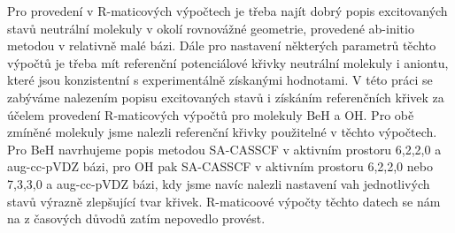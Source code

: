 Pro provedení v R-maticových výpočtech je třeba najít dobrý popis excitovaných stavů 
neutrální molekuly v okolí rovnovážné geometrie, 
provedené ab-initio metodou v relativně malé bázi. Dále  pro nastavení některých 
parametrů těchto výpočtů je třeba mít referenční 
potenciálové křivky neutrální molekuly i aniontu, které jsou konzistentní s 
experimentálně získanými hodnotami. V této práci se 
zabýváme nalezením popisu excitovaných stavů i získáním referenčních křivek za účelem 
provedení R-maticových výpočtů pro molekuly 
BeH a OH. 
Pro obě zmíněné molekuly jsme nalezli referenční křivky použitelné v těchto výpočtech. 
Pro BeH navrhujeme popis metodou SA-CASSCF v 
aktivním prostoru 6,2,2,0 a aug-cc-pVDZ bázi, pro OH pak SA-CASSCF v aktivním prostoru 
6,2,2,0 nebo 7,3,3,0 a aug-cc-pVDZ  bázi, kdy 
jsme navíc nalezli nastavení vah jednotlivých stavů výrazně zlepšující tvar křivek.
R-maticoové výpočty těchto datech se nám na z časových důvodů zatím nepovedlo provést.
